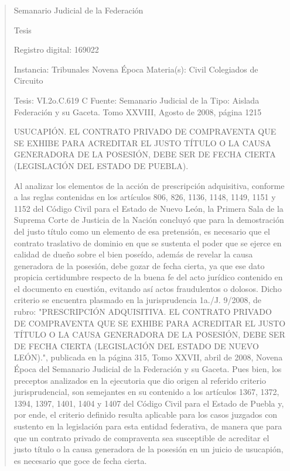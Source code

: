 \documentclass[11pt,a4paper]{article}
\begin{document}
\begin{quote}
                                                   Semanario Judicial de la Federación

                                                  Tesis

 Registro digital: 169022

 Instancia: Tribunales             Novena Época                          Materia(s): Civil
 Colegiados de Circuito

 Tesis: VI.2o.C.619 C              Fuente: Semanario Judicial de la      Tipo: Aislada
                                   Federación y su Gaceta.
                                   Tomo XXVIII, Agosto de 2008,
                                   página 1215


USUCAPIÓN. EL CONTRATO PRIVADO DE COMPRAVENTA QUE SE EXHIBE PARA
ACREDITAR EL JUSTO TÍTULO O LA CAUSA GENERADORA DE LA POSESIÓN, DEBE SER DE
FECHA CIERTA (LEGISLACIÓN DEL ESTADO DE PUEBLA).


Al analizar los elementos de la acción de prescripción adquisitiva, conforme a las reglas contenidas
en los artículos 806, 826, 1136, 1148, 1149, 1151 y 1152 del Código Civil para el Estado de Nuevo
León, la Primera Sala de la Suprema Corte de Justicia de la Nación concluyó que para la
demostración del justo título como un elemento de esa pretensión, es necesario que el contrato
traslativo de dominio en que se sustenta el poder que se ejerce en calidad de dueño sobre el bien
poseído, además de revelar la causa generadora de la posesión, debe gozar de fecha cierta, ya que
ese dato propicia certidumbre respecto de la buena fe del acto jurídico contenido en el documento
en cuestión, evitando así actos fraudulentos o dolosos. Dicho criterio se encuentra plasmado en la
jurisprudencia 1a./J. 9/2008, de rubro: "PRESCRIPCIÓN ADQUISITIVA. EL CONTRATO PRIVADO
DE COMPRAVENTA QUE SE EXHIBE PARA ACREDITAR EL JUSTO TÍTULO O LA CAUSA
GENERADORA DE LA POSESIÓN, DEBE SER DE FECHA CIERTA (LEGISLACIÓN DEL ESTADO
DE NUEVO LEÓN).", publicada en la página 315, Tomo XXVII, abril de 2008, Novena Época del
Semanario Judicial de la Federación y su Gaceta. Pues bien, los preceptos analizados en la
ejecutoria que dio origen al referido criterio jurisprudencial, son semejantes en su contenido a los
artículos 1367, 1372, 1394, 1397, 1401, 1404 y 1407 del Código Civil para el Estado de Puebla y,
por ende, el criterio definido resulta aplicable para los casos juzgados con sustento en la legislación
para esta entidad federativa, de manera que para que un contrato privado de compraventa sea
susceptible de acreditar el justo título o la causa generadora de la posesión en un juicio de
usucapión, es necesario que goce de fecha cierta.


\end{quote}
\end{document}
